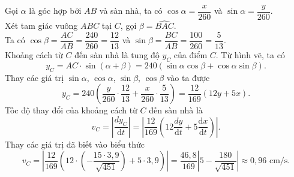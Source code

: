 \begin{ex}
{{
		}\noindent
		Gọi $\alpha$ là góc hợp bởi $AB$ và sàn nhà, ta có $\cos \alpha = \dfrac{x}{260}$ và $\sin \alpha = \dfrac{y}{260}$.\\
		Xét tam giác vuông $ABC$ tại $C$, gọi $\beta = \widehat{BAC}$.\\
		Ta có $\cos \beta = \dfrac{AC}{AB} = \dfrac{240}{260} = \dfrac{12}{13}$ và $\sin \beta = \dfrac{BC}{AB} = \dfrac{100}{260} = \dfrac{5}{13}$.\\
		Khoảng cách từ $C$ đến sàn nhà là tung độ $y_C$ của điểm $C$. Từ hình vẽ, ta có
		\[y_C = AC \cdot \sin(\alpha + \beta) = 240(\sin \alpha \cos \beta + \cos \alpha \sin \beta).\]
		Thay các giá trị $\sin \alpha$, $\cos \alpha$, $\sin \beta$, $\cos \beta$ vào ta được
		\[y_C = 240 \left( \dfrac{y}{260} \cdot \dfrac{12}{13} + \dfrac{x}{260} \cdot \dfrac{5}{13} \right) = \dfrac{12}{169}(12y + 5x).\]
		Tốc độ thay đổi của khoảng cách từ $C$ đến sàn nhà là
		\[v_C = \left| \dfrac{dy_C}{\mathrm{d}t} \right| = \left| \dfrac{12}{169} \left( 12 \dfrac{dy}{\mathrm{d}t} + 5 \dfrac{\mathrm{d}x}{\mathrm{d}t} \right) \right|.\]
		Thay các giá trị đã biết vào biểu thức
		\[v_C = \left| \dfrac{12}{169} \left( 12 \cdot \left( -\dfrac{15 \cdot 3{,}9}{\sqrt{451}} \right) + 5 \cdot 3{,}9 \right) \right| = \dfrac{46{,}8}{169} \left| 5 - \dfrac{180}{\sqrt{451}} \right| \approx 0{,}96\,\,\text{cm/s}.\]
	}
\end{ex}

